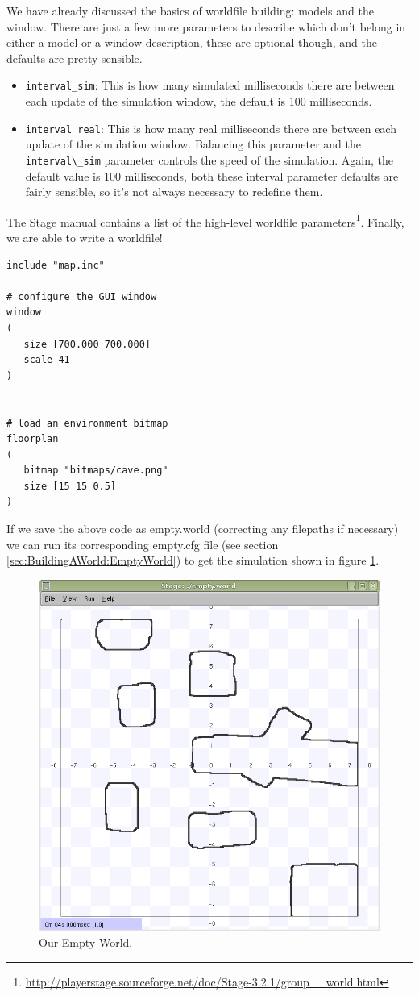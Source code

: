 \documentclass[a4paper]{report}
\begin{document}
We have already discussed the basics of worldfile building: models and the window. There are just a few more parameters to describe which don't belong in either a model or a window description, these are optional though, and the defaults are pretty sensible.
\begin{itemize}
\item \verb|interval_sim|: This is how many simulated milliseconds there are between each update of the simulation window, the default is 100 milliseconds.
\item \verb|interval_real|: This is how many real milliseconds there are between each update of the simulation window. Balancing this parameter and the \verb|interval\_sim| parameter controls the speed of the simulation. Again, the default value is 100 milliseconds, both these interval parameter defaults are fairly sensible, so it's not always necessary to redefine them.
\end{itemize}
The Stage manual contains a list of the high-level worldfile parameters\footnote{\url{http://playerstage.sourceforge.net/doc/Stage-3.2.1/group__world.html}}.\newline
Finally, we are able to write a worldfile!
\begin{verbatim}
include "map.inc"

# configure the GUI window
window
( 
   size [700.000 700.000] 
   scale 41
)


# load an environment bitmap
floorplan
(
   bitmap "bitmaps/cave.png" 
   size [15 15 0.5]
)
\end{verbatim}
If we save the above code as empty.world (correcting any filepaths if necessary) we can run its corresponding empty.cfg file (see section \ref{sec:BuildingAWorld:EmptyWorld}) to get the simulation shown in figure \ref{fig:BuildingAWorld:EmptyWorld:BasicWorldfile:FinalEmptyWorld}.

\begin{figure}
	\centering
	\includegraphics[width=0.7\linewidth]{./pics/empty_world/finalEmptyWorld.png} 
	\caption{Our Empty World.}
	\label{fig:BuildingAWorld:EmptyWorld:BasicWorldfile:FinalEmptyWorld}
\end{figure}
\end{document}
